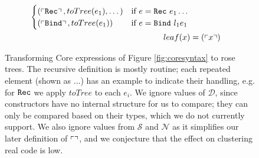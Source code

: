 \begin{figure}
\begin{align*}
\begin{cases}
      (\feature{\CRec},     toTree(e_1), \dots)                         & \text{if $e = \CRec\ e_1 \dots$} \\
      (\feature{\CBind},    toTree(e_1))                                & \text{if $e = \CBind\ l_1 e_1$}
    \end{cases} \\
    leaf(x) &= (\feature{x}) \iffalse TODO: This is completely unnecessary... \fi
  \end{align*}
  \caption{Transforming Core expressions of Figure \ref{fig:coresyntax} to rose trees. The recursive definition is mostly routine; each repeated element (shown as $\dots$) has an example to indicate their handling, e.g. for $\texttt{Rec}$ we apply $toTree$ to each $e_i$. We ignore values of $\mathcal{D}$, since constructors have no internal structure for us to compare; they can only be compared based on their types, which we do not currently support. We also ignore values from $\mathcal{S}$ and $\mathcal{N}$ as it simplifies our later definition of $\left\ulcorner  \right\urcorner$, and we conjecture that the effect on clustering real code is low.}
  \label{fig:totree}
\end{figure}

